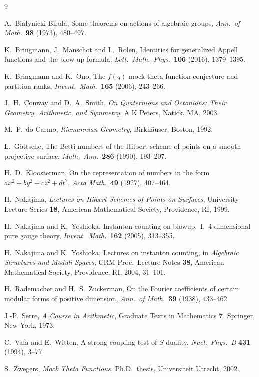 \documentclass[11pt,a4paper]{article}
\theoremstyle{plain}
\theoremstyle{definition}
\theoremstyle{remark}
\begin{document}
\begin{thebibliography}{9}

A.~Bia{\l}ynicki-Birula, Some theorems on actions of algebraic groups, \textit{Ann.\ of Math.}\ \textbf{98} (1973), 480--497.

K.~Bringmann, J.~Manschot and L.~Rolen, Identities for generalized Appell functions and the blow-up formula, \textit{Lett.\ Math.\ Phys.}\ \textbf{106} (2016), 1379--1395.

K.~Bringmann and K.~Ono, The $f(q)$ mock theta function conjecture and partition ranks, \textit{Invent.\ Math.}\ \textbf{165} (2006), 243--266.

J.~H.~Conway and D.~A.~Smith, \textit{On Quaternions and Octonions: Their Geometry, Arithmetic, and Symmetry}, A K Peters, Natick, MA, 2003.

M.~P.~do Carmo, \textit{Riemannian Geometry}, Birkh\"auser, Boston, 1992.

L.~G\"ottsche, The Betti numbers of the Hilbert scheme of points on a smooth projective surface, \textit{Math.\ Ann.}\ \textbf{286} (1990), 193--207.

H.~D.~Kloosterman, On the representation of numbers in the form $ax^2 + by^2 + cz^2 + dt^2$, \textit{Acta Math.}\ \textbf{49} (1927), 407--464.

H.~Nakajima, \textit{Lectures on Hilbert Schemes of Points on Surfaces}, University Lecture Series \textbf{18}, American Mathematical Society, Providence, RI, 1999.

H.~Nakajima and K.~Yoshioka, Instanton counting on blowup.\ I.\ 4-dimensional pure gauge theory, \textit{Invent.\ Math.}\ \textbf{162} (2005), 313--355.

H.~Nakajima and K.~Yoshioka, Lectures on instanton counting, in \textit{Algebraic Structures and Moduli Spaces}, CRM Proc.\ Lecture Notes \textbf{38}, American Mathematical Society, Providence, RI, 2004, 31--101.

H.~Rademacher and H.~S.~Zuckerman, On the Fourier coefficients of certain modular forms of positive dimension, \textit{Ann.\ of Math.}\ \textbf{39} (1938), 433--462.

J.-P.~Serre, \textit{A Course in Arithmetic}, Graduate Texts in Mathematics \textbf{7}, Springer, New York, 1973.

C.~Vafa and E.~Witten, A strong coupling test of $S$-duality, \textit{Nucl.\ Phys.\ B} \textbf{431} (1994), 3--77.

S.~Zwegers, \textit{Mock Theta Functions}, Ph.D.\ thesis, Universiteit Utrecht, 2002.

\end{thebibliography}
\end{document}
